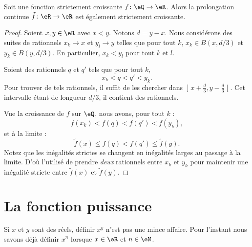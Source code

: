 \begin{proposition}      \label{PROPooTNIAooNAJDzL}
    Soit une fonction strictement croissante \( f\colon \eQ\to \eR\). Alors la prolongation continue \( \tilde f\colon \eR\to \eR\) est également strictement croissante.
\end{proposition}

\begin{proof}
    Soient \( x,y\in \eR\) avec \( x<y\). Notons \( d=y-x\). Nous considérons des suites de rationnels \( x_k\to x\) et \( y_l\to y\) telles que pour tout \( k\), \( x_k\in B(x,d/3)\) et \( y_k\in B(y,d/3)\). En particulier, \( x_k<y_l\) pour tout \( k\) et \( l\).

    Soient des rationnels \( q\) et \( q'\) tels que pour tout \( k\),
    \begin{equation}
        x_k<q<q'<y_k.
    \end{equation}
    Pour trouver de tels rationnels, il suffit de les chercher dans \( \mathopen] x+\frac{ d }{ 3 } , y-\frac{ d }{ 3 } \mathclose[\). Cet intervalle étant de longueur \( d/3\), il contient des rationnels.

    Vue la croissance de \( f\) sur \( \eQ\), nous avons, pour tout \( k\) :
    \begin{equation}
        f(x_k)<f(q)<f(q')<f(y_k),
    \end{equation}
    et à la limite :
    \begin{equation}
        \tilde f(x)\leq f(q)<f(q')\leq \tilde f(y).
    \end{equation}
    Notez que les inégalités strictes se changent en inégalités larges au passage à la limite. D'où l'utilisé de prendre \emph{deux} rationnels entre \( x_k\) et \( y_k\) pour maintenir une inégalité stricte entre \(\tilde f(x)\) et \( \tilde f(y)\).

\end{proof}

\section{La fonction puissance}

Si \( x\) et \( y\) sont des réels, définir \( x^y\) n'est pas une mince affaire. Pour l'instant nous savons déjà définir \( x^n\) lorsque \( x\in \eR\) et \( n\in \eN\).

